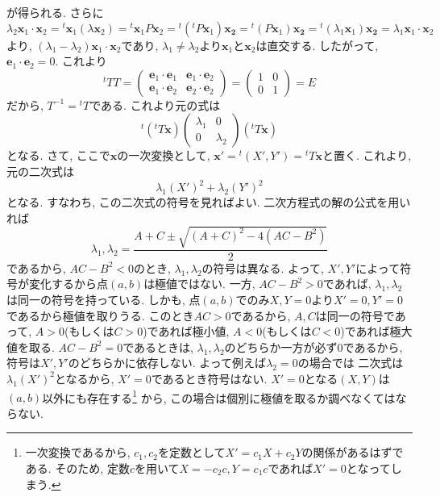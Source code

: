         が得られる.  さらに
        \begin{equation*}
            \lambda_2 \bm{x}_1\cdot\bm{x}_2={}^t\!\bm{x}_1(\lambda\bm{x}_2)={}^t\!\bm{x}_1P\bm{x}_2={}^t\!({}^t\!P\bm{x}_1)\bm{x_2}={}^t\!(P\bm{x}_1)\bm{x_2}={}^t\!(\lambda_1\bm{x}_1)\bm{x_2}=\lambda_1\bm{x}_1\cdot\bm{x}_2
        \end{equation*}
        より, $(\lambda_1-\lambda_2)\bm{x}_1\cdot\bm{x}_2$であり, $\lambda_1\neq \lambda_2$より$\bm{x}_1$と$\bm{x}_2$は直交する. したがって, $\bm{e}_1\cdot\bm{e}_2=0$.
        これより
        \begin{equation*}
            {}^t\!TT=\begin{pmatrix}\bm{e}_1\cdot\bm{e}_1 & \bm{e}_1\cdot\bm{e}_2 \\ \bm{e}_1\cdot\bm{e}_2 & \bm{e}_2\cdot\bm{e}_2\end{pmatrix}=\begin{pmatrix}1 & 0 \\ 0 & 1\end{pmatrix}=E
        \end{equation*}
        だから, $T^{-1}={}^t\!T$である. これより元の式は
        \begin{equation*}
            {}^t\!({}^t\!T\bm{x})\begin{pmatrix}\lambda_1 & 0 \\ 0 & \lambda_2\end{pmatrix}({}^t\!T\bm{x})
        \end{equation*}
        となる. さて, ここで$\bm{x}$の一次変換として, $\bm{x}'={}^t\!(X',Y')={}^t\!T\bm{x}$と置く. これより, 元の二次式は
        \begin{equation*}
            \lambda_1(X')^2+\lambda_2(Y')^2
        \end{equation*}
        となる. すなわち, この二次式の符号を見ればよい. 二次方程式の解の公式を用いれば
        \begin{equation*}
            \lambda_1,\lambda_2=\frac{A+C\pm\sqrt{(A+C)^2-4(AC-B^2)}}{2}
        \end{equation*}
        であるから, $AC-B^2<0$のとき, $\lambda_1,\lambda_2$の符号は異なる. よって, $X',Y'$によって符号が変化するから点$(a,b)$は極値ではない.
        一方, $AC-B^2>0$であれば, $\lambda_1,\lambda_2$は同一の符号を持っている. しかも, 点$(a,b)$でのみ$X,Y=0$より$X'=0,Y'=0$であるから極値を取りうる.
        このとき$AC>0$であるから, $A,C$は同一の符号であって, $A>0$(もしくは$C>0$)であれば極小値, $A<0$(もしくは$C<0$)であれば極大値を取る.
        $AC-B^2=0$であるときは, $\lambda_1,\lambda_2$のどちらか一方が必ず0であるから, 符号は$X',Y'$のどちらかに依存しない. よって例えば$\lambda_2=0$の場合では
        二次式は$\lambda_1(X')^2$となるから, $X'=0$であるとき符号はない. $X'=0$となる$(X,Y)$は$(a,b)$以外にも存在する\footnote{一次変換であるから, $c_1,c_2$を定数として$X'=c_1X+c_2Y$の関係があるはずである. そのため, 定数$c$を用いて$X=-c_2c,Y=c_1c$であれば$X'=0$となってしまう.}
        から, この場合は個別に極値を取るか調べなくてはならない.

